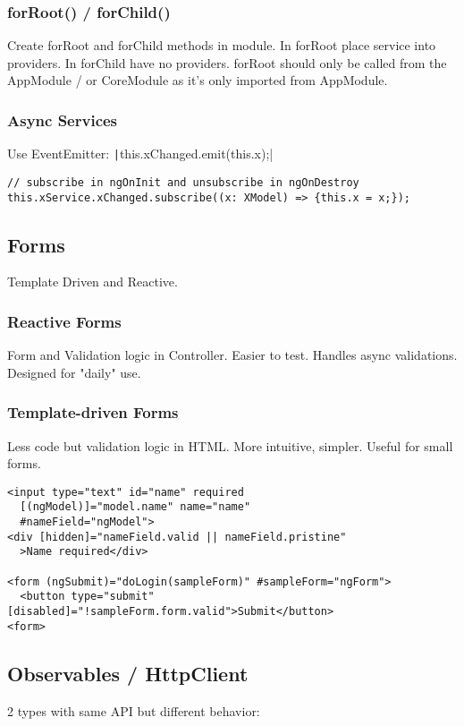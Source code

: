 \begin{multicols*}{2}
\subsubsection{forRoot() / forChild()}
Create forRoot and forChild methods in module. In forRoot place service into providers. In forChild have no providers. forRoot should only be called from the AppModule / or CoreModule as it's only imported from AppModule.
\subsubsection{Async Services}
Use EventEmitter: \texttt|this.xChanged.emit(this.x);|
\begin{verbatim}
// subscribe in ngOnInit and unsubscribe in ngOnDestroy
this.xService.xChanged.subscribe((x: XModel) => {this.x = x;});
\end{verbatim}

\subsection{Forms}
Template Driven and Reactive.

\subsubsection{Reactive Forms}
Form and Validation logic in Controller. Easier to test. Handles async validations. Designed for "daily" use.

\subsubsection{Template-driven Forms}
Less code but validation logic in HTML. More intuitive, simpler. Useful for small forms.

\begin{verbatim}
<input type="text" id="name" required
  [(ngModel)]="model.name" name="name"
  #nameField="ngModel">
<div [hidden]="nameField.valid || nameField.pristine"
  >Name required</div>

<form (ngSubmit)="doLogin(sampleForm)" #sampleForm="ngForm">
  <button type="submit" [disabled]="!sampleForm.form.valid">Submit</button>
<form>
\end{verbatim}

\subsection{Observables / HttpClient}
2 types with same API but different behavior:


\end{multicols*}
